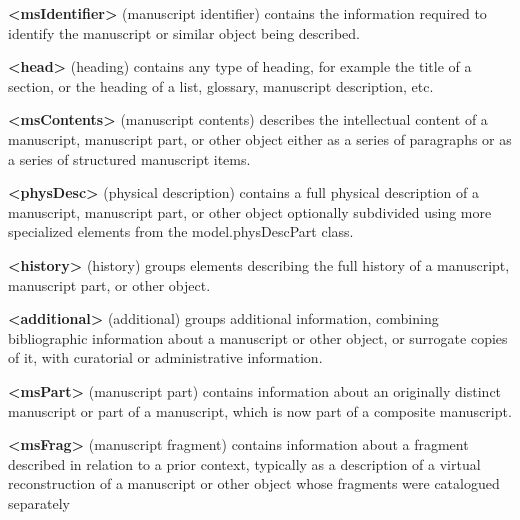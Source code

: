 \begin{sansreflist}
  
\item [\textbf{<msIdentifier>}] (manuscript identifier) contains the information required to identify the manuscript or similar object being described.
\item [\textbf{<head>}] (heading) contains any type of heading, for example the title of a section, or the heading of a list, glossary, manuscript description, etc.
\item [\textbf{<msContents>}] (manuscript contents) describes the intellectual content of a manuscript, manuscript part, or other object either as a series of paragraphs or as a series of structured manuscript items.
\item [\textbf{<physDesc>}] (physical description) contains a full physical description of a manuscript, manuscript part, or other object optionally subdivided using more specialized elements from the \textsf{model.physDescPart} class.
\item [\textbf{<history>}] (history) groups elements describing the full history of a manuscript, manuscript part, or other object.
\item [\textbf{<additional>}] (additional) groups additional information, combining bibliographic information about a manuscript or other object, or surrogate copies of it, with curatorial or administrative information.
\item [\textbf{<msPart>}] (manuscript part) contains information about an originally distinct manuscript or part of a manuscript, which is now part of a composite manuscript.
\item [\textbf{<msFrag>}] (manuscript fragment) contains information about a fragment described in relation to a prior context, typically as a description of a virtual reconstruction of a manuscript or other object whose fragments were catalogued separately
\end{sansreflist}
\par
